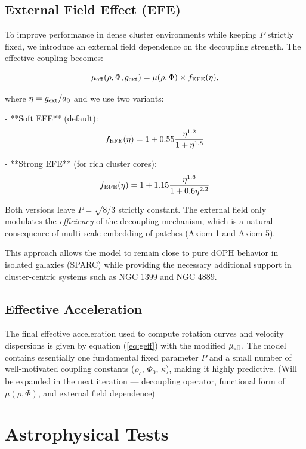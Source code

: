 \documentclass[12pt,a4paper]{article}
\begin{document}
\subsection{External Field Effect (EFE)}

To improve performance in dense cluster environments while keeping \(P\) strictly fixed, we introduce an external field dependence on the decoupling strength. The effective coupling becomes:

\begin{equation}
\mu_{\rm eff}(\rho, \Phi, g_{\rm ext}) = \mu(\rho, \Phi) \times f_{\rm EFE}(\eta),
\end{equation}

where \(\eta = g_{\rm ext} / a_0\) and we use two variants:

- **Soft EFE** (default):
  \[
  f_{\rm EFE}(\eta) = 1 + 0.55 \frac{\eta^{1.2}}{1 + \eta^{1.8}}
  \]

- **Strong EFE** (for rich cluster cores):
  \[
  f_{\rm EFE}(\eta) = 1 + 1.15 \frac{\eta^{1.6}}{1 + 0.6 \eta^{2.2}}
  \]

Both versions leave \(P = \sqrt{8/3}\) strictly constant. The external field only modulates the \emph{efficiency} of the decoupling mechanism, which is a natural consequence of multi-scale embedding of patches (Axiom 1 and Axiom 5).

This approach allows the model to remain close to pure dOPH behavior in isolated galaxies (SPARC) while providing the necessary additional support in cluster-centric systems such as NGC 1399 and NGC 4889.

\subsection{Effective Acceleration}

The final effective acceleration used to compute rotation curves and velocity dispersions is given by equation (\ref{eq:geff}) with the modified \(\mu_{\rm eff}\). The model contains essentially one fundamental fixed parameter \(P\) and a small number of well-motivated coupling constants (\(\rho_c\), \(\Phi_0\), \(\kappa\)), making it highly predictive.
(Will be expanded in the next iteration — decoupling operator, functional form of $\mu(\rho,\Phi)$, and external field dependence)

\section{Astrophysical Tests}
\end{document}
